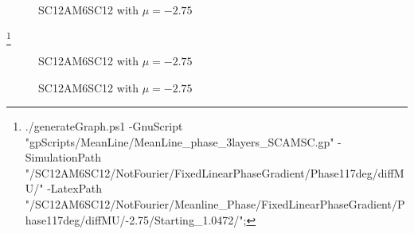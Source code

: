 \documentclass[../main.tex]{subfiles}
\begin{document}
\begin{figure}[H]
    \centering
    
    \caption{SC12AM6SC12 with $\mu = -2.75$}
\end{figure}
\footnote{./generateGraph.ps1 -GnuScript "gpScripts/MeanLine/MeanLine\_phase\_3layers\_SCAMSC.gp" -SimulationPath "/SC12AM6SC12/NotFourier/FixedLinearPhaseGradient/Phase117deg/diffMU/" -LatexPath "/SC12AM6SC12/NotFourier/Meanline\_Phase/FixedLinearPhaseGradient/Phase117deg/diffMU/-2.75/Starting\_1.0472/";
}

\begin{figure}[H]
    \centering
    
    \caption{SC12AM6SC12 with $\mu = -2.75$}
\end{figure}

\begin{figure}[H]
    \centering
    
    \caption{SC12AM6SC12 with $\mu = -2.75$}
\end{figure}

%     

%     
\end{document}
